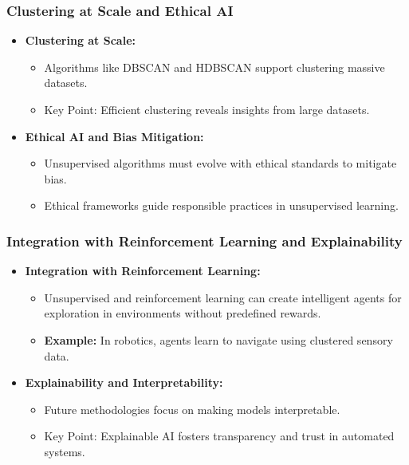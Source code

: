 \documentclass[aspectratio=169]{beamer}
\begin{document}
\begin{frame}[fragile]
    \frametitle{Clustering at Scale and Ethical AI}
    \begin{itemize}
        \item \textbf{Clustering at Scale:}
        \begin{itemize}
            \item Algorithms like DBSCAN and HDBSCAN support clustering massive datasets.
            \item Key Point: Efficient clustering reveals insights from large datasets.
        \end{itemize}
        
        \item \textbf{Ethical AI and Bias Mitigation:}
        \begin{itemize}
            \item Unsupervised algorithms must evolve with ethical standards to mitigate bias.
            \item Ethical frameworks guide responsible practices in unsupervised learning.
        \end{itemize}
    \end{itemize}
\end{frame}

\begin{frame}[fragile]
    \frametitle{Integration with Reinforcement Learning and Explainability}
    \begin{itemize}
        \item \textbf{Integration with Reinforcement Learning:}
        \begin{itemize}
            \item Unsupervised and reinforcement learning can create intelligent agents for exploration in environments without predefined rewards.
            \item \textbf{Example:} In robotics, agents learn to navigate using clustered sensory data.
        \end{itemize}
        
        \item \textbf{Explainability and Interpretability:}
        \begin{itemize}
            \item Future methodologies focus on making models interpretable.
            \item Key Point: Explainable AI fosters transparency and trust in automated systems.
        \end{itemize}
    \end{itemize}
\end{frame}
\end{document}
